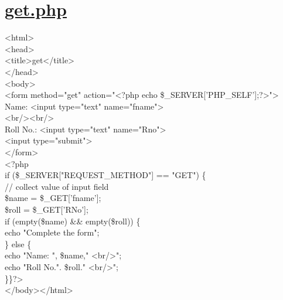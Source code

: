 \section*{\fontsize{16}{14}\selectfont \underline{get.php}}
<html>\\
<head>\\
<title>get</title>\\
</head>\\
<body>\\
<form method="get" action="<?php echo \$\_SERVER['PHP\_SELF'];?>">\\
  Name: <input type="text" name="fname">\\
  <br/><br/>\\
  Roll No.: <input type="text" name="Rno">\\
  <input type="submit">\\
</form>\\
<?php\\
if (\$\_SERVER["REQUEST\_METHOD"] == "GET") \{\\
    // collect value of input field\\
    \$name = \$\_GET['fname'];\\
    \$roll = \$\_GET['RNo'];\\
    if (empty(\$name) \&\& empty(\$roll)) \{ \\
        echo "Complete the form";\\
   \} else \{ \\
        echo "Name: ", \$name," <br/>";\\
        echo "Roll No.". \$roll." <br/>";\\
    \}\}?>\\
</body></html>

